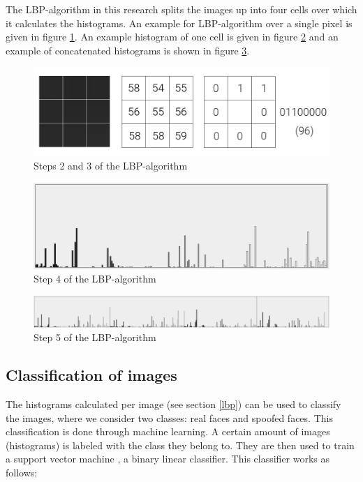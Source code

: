 \documentclass{sig-alternate-br}
\begin{document}
The LBP-algorithm in this research splits the images up into four cells over which it calculates the histograms. An example for LBP-algorithm over a single pixel is given in figure \ref{fig:lbp_pixel}. An example histogram of one cell is given in figure \ref{fig:histogram} and an example of concatenated histograms is shown in figure \ref{fig:concat_histograms}.

\begin{figure}[h]
	\includegraphics[scale=0.2]{lbp_pixel}
	\caption{Steps 2 and 3 of the LBP-algorithm}
	\label{fig:lbp_pixel}
\end{figure}

\begin{figure}[h]
	\includegraphics[scale=0.2]{histogram}
	\caption{Step 4  of the LBP-algorithm}
	\label{fig:histogram}
\end{figure}

\begin{figure}[h]
	\includegraphics[scale=0.1]{concat_histograms}
	\caption{Step 5 of the LBP-algorithm}
	\label{fig:concat_histograms}
\end{figure}

\subsection{Classification of images}
The histograms calculated per image (see section \ref{lbp}) can be used to classify the images, where we consider two classes: real faces and spoofed faces. This classification is done through machine learning. A certain amount of images (histograms) is labeled with the class they belong to. They are then used to train a support vector machine \cite{hsu2003practical}, a binary linear classifier. This classifier works as follows:
\end{document}
